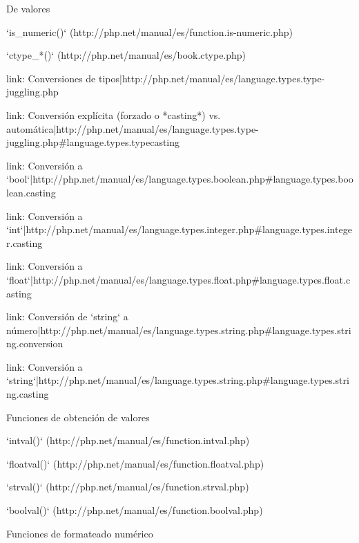 \begin{longenum}
\begin{longenum}
\begin{longenum}
\begin{longenum}
                \item De valores
                \begin{longenum}
                    \item [`is_numeric()`](http://php.net/manual/es/function.is-numeric.php)
                    \item [`ctype_*()`](http://php.net/manual/es/book.ctype.php)
                \end{longenum}
            \end{longenum}
            \item [link: Conversiones de tipos|http://php.net/manual/es/language.types.type-juggling.php]
            \begin{longenum}
                \item [link: Conversión explícita (forzado o *casting*) vs. automática|http://php.net/manual/es/language.types.type-juggling.php#language.types.typecasting]
                \item [link: Conversión a `bool`|http://php.net/manual/es/language.types.boolean.php#language.types.boolean.casting]
                \item [link: Conversión a `int`|http://php.net/manual/es/language.types.integer.php#language.types.integer.casting]
                \item [link: Conversión a `float`|http://php.net/manual/es/language.types.float.php#language.types.float.casting]
                \item [link: Conversión de `string` a número|http://php.net/manual/es/language.types.string.php#language.types.string.conversion]
                \item [link: Conversión a `string`|http://php.net/manual/es/language.types.string.php#language.types.string.casting]
                \item Funciones de obtención de valores
                \begin{longenum}
                    \item [`intval()`](http://php.net/manual/es/function.intval.php)
                    \item [`floatval()`](http://php.net/manual/es/function.floatval.php)
                    \item [`strval()`](http://php.net/manual/es/function.strval.php)
                    \item [`boolval()`](http://php.net/manual/es/function.boolval.php)
                \end{longenum}
                \item Funciones de formateado numérico

\end{longenum}
\end{longenum}
\end{longenum}
\end{longenum}
